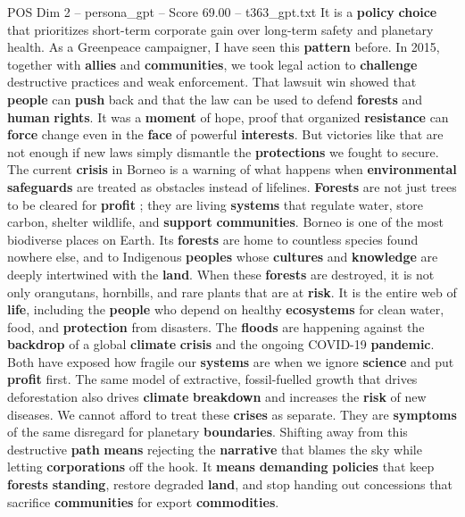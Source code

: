 \begin{textsample}{POS Dim 2 – persona\_gpt – Score 69.00 – t363\_gpt.txt}
It is a \textbf{policy} \textbf{choice} that prioritizes short-term corporate gain over long-term safety and planetary health.
As a Greenpeace campaigner, I have seen this \textbf{pattern} before.
In 2015, together with \textbf{allies} and \textbf{communities}, we took legal action to \textbf{challenge} destructive practices and weak enforcement.
That lawsuit win showed that \textbf{people} can \textbf{push} back and that the law can be used to defend \textbf{forests} and \textbf{human} \textbf{rights}.
It was a \textbf{moment} of hope, proof that organized \textbf{resistance} can \textbf{force} change even in the \textbf{face} of powerful \textbf{interests}.
But victories like that are not enough if new laws simply dismantle the \textbf{protections} we fought to secure.
The current \textbf{crisis} in Borneo is a warning of what happens when \textbf{environmental} \textbf{safeguards} are treated as obstacles instead of lifelines. \textbf{Forests} are not just trees to be cleared for \textbf{profit} ; they are living \textbf{systems} that regulate water, store carbon, shelter wildlife, and \textbf{support} \textbf{communities}.
Borneo is one of the most biodiverse places on Earth.
Its \textbf{forests} are home to countless species found nowhere else, and to Indigenous \textbf{peoples} whose \textbf{cultures} and \textbf{knowledge} are deeply intertwined with the \textbf{land}.
When these \textbf{forests} are destroyed, it is not only orangutans, hornbills, and rare plants that are at \textbf{risk}.
It is the entire web of \textbf{life}, including the \textbf{people} who depend on healthy \textbf{ecosystems} for clean water, food, and \textbf{protection} from disasters.
The \textbf{floods} are happening against the \textbf{backdrop} of a global \textbf{climate} \textbf{crisis} and the ongoing COVID-19 \textbf{pandemic}.
Both have exposed how fragile our \textbf{systems} are when we ignore \textbf{science} and put \textbf{profit} first.
The same model of extractive, fossil-fuelled growth that drives deforestation also drives \textbf{climate} \textbf{breakdown} and increases the \textbf{risk} of new diseases.
We cannot afford to treat these \textbf{crises} as separate.
They are \textbf{symptoms} of the same disregard for planetary \textbf{boundaries}.
Shifting away from this destructive \textbf{path} \textbf{means} rejecting the \textbf{narrative} that blames the sky while letting \textbf{corporations} off the hook.
It \textbf{means} \textbf{demanding} \textbf{policies} that keep \textbf{forests} \textbf{standing}, restore degraded \textbf{land}, and stop handing out concessions that sacrifice \textbf{communities} for export \textbf{commodities}.

\end{textsample}

